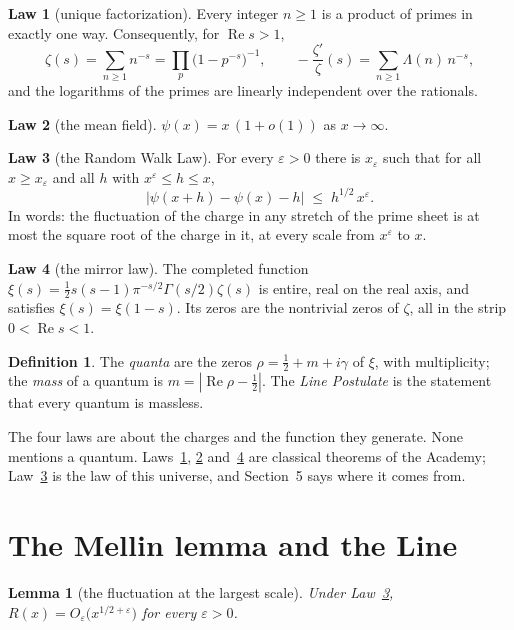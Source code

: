 \documentclass[11pt]{article}
\newtheorem{lemma}[theorem]{Lemma}
\theoremstyle{definition}
\newtheorem{definition}[theorem]{Definition}
\newtheorem{law}{Law}
\theoremstyle{remark}
\newcommand{\Ree}{\operatorname{Re}}
\newcommand{\ps}{\psi}
\begin{document}
\begin{law}[unique factorization]\label{law:uf}
Every integer $n\ge1$ is a product of primes in exactly one way. Consequently, for $\Ree s>1$,
\[
\zeta(s)=\sum_{n\ge1}n^{-s}=\prod_p\big(1-p^{-s}\big)^{-1},\qquad -\frac{\zeta'}{\zeta}(s)=\sum_{n\ge1}\Lambda(n)\,n^{-s},
\]
and the logarithms of the primes are linearly independent over the rationals.
\end{law}

\begin{law}[the mean field]\label{law:pnt}
$\ps(x)=x\,(1+o(1))$ as $x\to\infty$.
\end{law}

\begin{law}[the Random Walk Law]\label{law:rw}
For every $\varepsilon>0$ there is $x_\varepsilon$ such that for all $x\ge x_\varepsilon$ and all $h$ with $x^{\varepsilon}\le h\le x$,
\[
\big|\ps(x+h)-\ps(x)-h\big|\;\le\;h^{1/2}\,x^{\varepsilon}.
\]
In words: the fluctuation of the charge in any stretch of the prime sheet is at most the square root of the charge in it, at every scale from $x^\varepsilon$ to $x$.
\end{law}

\begin{law}[the mirror law]\label{law:mirror}
The completed function $\xi(s)=\tfrac12 s(s-1)\pi^{-s/2}\Gamma(s/2)\zeta(s)$ is entire, real on the real axis, and satisfies $\xi(s)=\xi(1-s)$. Its zeros are the nontrivial zeros of $\zeta$, all in the strip $0<\Ree s<1$.
\end{law}

\begin{definition}
The \emph{quanta} are the zeros $\rho=\tfrac12+m+i\gamma$ of $\xi$, with multiplicity; the \emph{mass} of a quantum is $m=|\Ree\rho-\tfrac12|$. The \emph{Line Postulate} is the statement that every quantum is massless.
\end{definition}

The four laws are about the charges and the function they generate. None mentions a quantum. Laws~\ref{law:uf}, \ref{law:pnt} and~\ref{law:mirror} are classical theorems of the Academy; Law~\ref{law:rw} is the law of this universe, and Section~5 says where it comes from.

\section{The Mellin lemma and the Line}

\begin{lemma}[the fluctuation at the largest scale]\label{lem:koch}
Under Law~\ref{law:rw}, $R(x)=O_\varepsilon\big(x^{1/2+\varepsilon}\big)$ for every $\varepsilon>0$.
\end{lemma}
\end{document}
